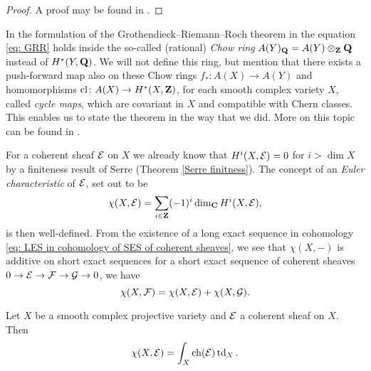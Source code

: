 \begin{proof}
    A proof may be found in \cite[\S 15]{Fulton1998}.
\end{proof}

\begin{remark}
    In the formulation of the Grothendieck--Riemann--Roch theorem in \cite[\S 15, Theorem 15.2]{Fulton1998} the equation \eqref{eq: GRR} holds inside the so-called (rational) \emph{Chow ring} $A(Y)_\mathbf Q = A(Y) \otimes_{\mathbf Z} \mathbf Q$ instead of $H^{*}(Y, \mathbf Q)$. We will not define this ring, but mention that there exists a push-forward map also on these Chow rings $f_* \colon A(X) \to A(Y)$ and homomorphisms $\operatorname{cl} \colon A(X) \to H^{*}(X, \mathbf Z)$, for each smooth complex variety $X$, called \emph{cycle maps}, which are covariant in $X$ and compatible with Chern classes. This enables us to state the theorem in the way that we did. More on this topic can be found in \cite[\S 19]{Fulton1998}.
\end{remark}

For a coherent sheaf $\mathcal E$ on $X$ we already know that $H^{i}(X, \mathcal E) = 0$ for $i > \dim X$ by a finiteness result of Serre (Theorem \ref{Serre finitness}). The concept of an \emph{Euler characteristic} of $\mathcal E$, set out to be
\[
    \chi(X, \mathcal E) = \sum_{i \in \mathbf Z} (-1)^i \dim_\mathbf C H^i(X, \mathcal E),
\] 
is then well-defined. From the existence of a long exact sequence in cohomology \eqref{eq: LES in cohomology of SES of coherent sheaves}, we see that $\chi(X, -)$ is additive on short exact sequences \ie for a short exact sequence of coherent sheaves $0 \to \mathcal E \to \mathcal F \to \mathcal G \to 0$, we have
\[
    \chi(X, \mathcal F) = \chi(X, \mathcal E) + \chi(X, \mathcal G).
\]
\begin{theorem}
    \label{Hirzebruch-Riemann-Roch}
    Let $X$ be a smooth complex projective variety and $\mathcal E$ a coherent sheaf on $X$. Then
    \begin{equation}
        \label{eq: Hirzebruch-Riemann-Roch formula}
        \chi(X, \E) = \int_X \ch{\E}\tdclass{X}.
    \end{equation}
\end{theorem}

